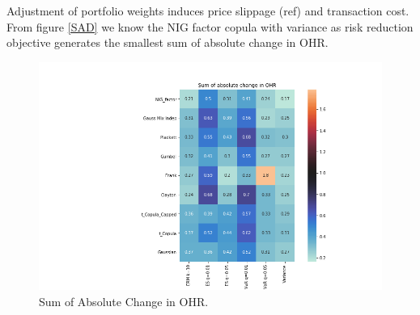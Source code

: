 Adjustment of portfolio weights induces price slippage (ref) and transaction cost.
From figure \ref{SAD} we know the NIG factor copula with variance as risk reduction objective generates the smallest
sum of absolute change in OHR.

\begin{figure}[!th]
   \centering
   \includegraphics[width=\textwidth]{_pics/Sum of absolute change in OHR.png}
   \caption{Sum of Absolute Change in OHR.
   }
   \label{fig:SAD}
\end{figure}